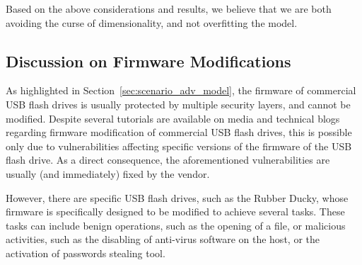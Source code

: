 \documentclass[acmsmall, authorversion]{acmart}
\begin{document}
Based on the above considerations and results, we believe that we are both avoiding the curse of dimensionality, and not overfitting the model.

\subsection{Discussion on Firmware Modifications}
\label{sec:fw_mod}
As highlighted in Section~\ref{sec:scenario_adv_model}, the firmware of commercial USB flash drives is usually protected by multiple security layers, and cannot be modified. Despite several tutorials are available on media and technical blogs regarding firmware modification of commercial USB flash drives, this is possible only due to vulnerabilities affecting specific versions of the firmware of the USB flash drive. As a direct consequence, the aforementioned vulnerabilities are usually (and immediately) fixed by the vendor.

However, there are specific USB flash drives, such as the Rubber Ducky, whose firmware is specifically designed to be modified to achieve several tasks. These tasks can include benign operations, such as the opening of a file, or malicious activities, such as the disabling of anti-virus software on the host, or the activation of passwords stealing tool.
\end{document}
